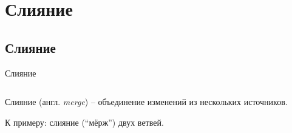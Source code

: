 \documentclass[presentation]{beamer}
\begin{document}


\section{Слияние}

\subsection{Слияние}

\begin{frame}{Слияние}
  \begin{columns}
    \begin{column}{.5\textwidth}
      \raisebox{-.30em}{\Large\HandRight}\hspace{.25em} Слияние
      (англ. \emph{merge}) -- объединение изменений из нескольких
      источников.\newline\newline

      К примеру: слияние (``мёрж'') двух ветвей.\newline\newline
      

\end{column}
\end{columns}
\end{frame}
\end{document}
